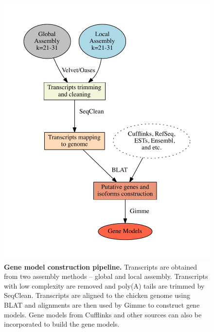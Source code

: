 \documentclass[10pt]{article}
\begin{document}
\begin{figure}[!ht]
\begin{center}
\includegraphics[width=5in]{pipeline.pdf}
\end{center}
\caption{
{\bf Gene model construction pipeline.}
Transcripts are obtained from two assembly methods -- global and
local assembly. Transcripts with low complexity are removed and
poly(A) tails are trimmed by SeqClean. Transcripts are aligned to
the chicken genome using BLAT and alignments are then used by
Gimme to construct gene models. Gene models from Cufflinks and
other sources can also be incorporated to build the gene models.
}
\label{img:pipeline}
\end{figure}
\end{document}
